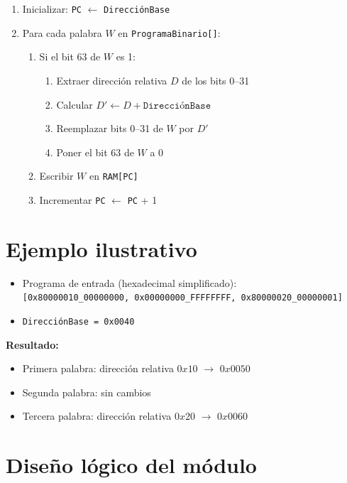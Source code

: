 \documentclass{article}
\begin{document}
\begin{enumerate}
  \item Inicializar: \texttt{PC} $\leftarrow$ \texttt{DirecciónBase}
  \item Para cada palabra $W$ en \texttt{ProgramaBinario[]}:
  \begin{enumerate}
    \item Si el bit 63 de $W$ es 1:
    \begin{enumerate}
      \item Extraer dirección relativa $D$ de los bits 0--31
      \item Calcular $D' \leftarrow D + \texttt{DirecciónBase}$
      \item Reemplazar bits 0--31 de $W$ por $D'$
      \item Poner el bit 63 de $W$ a 0
    \end{enumerate}
    \item Escribir $W$ en \texttt{RAM[PC]}
    \item Incrementar \texttt{PC} $\leftarrow$ \texttt{PC} + 1
  \end{enumerate}
\end{enumerate}

\section*{Ejemplo ilustrativo}

\begin{itemize}
  \item Programa de entrada (hexadecimal simplificado):\\
  \texttt{[0x80000010\_00000000, 0x00000000\_FFFFFFFF, 0x80000020\_00000001]}
  \item \texttt{DirecciónBase = 0x0040}
\end{itemize}

\textbf{Resultado:}
\begin{itemize}
  \item Primera palabra: dirección relativa $0x10$ $\rightarrow$ $0x0050$
  \item Segunda palabra: sin cambios
  \item Tercera palabra: dirección relativa $0x20$ $\rightarrow$ $0x0060$
\end{itemize}

\section*{Diseño lógico del módulo}
\end{document}
